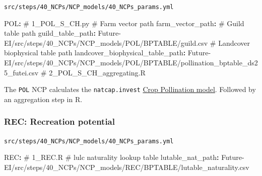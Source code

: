 \documentclass[
  letterpaper,
  DIV=11,
  numbers=noendperiod]{scrreprt}
\newenvironment{Shaded}{\begin{snugshade}}{\end{snugshade}}
\newcommand{\AttributeTok}[1]{\textcolor[rgb]{0.40,0.45,0.13}{#1}}
\newcommand{\CommentTok}[1]{\textcolor[rgb]{0.37,0.37,0.37}{#1}}
\newcommand{\FunctionTok}[1]{\textcolor[rgb]{0.28,0.35,0.67}{#1}}
\newcommand{\KeywordTok}[1]{\textcolor[rgb]{0.00,0.23,0.31}{\textbf{#1}}}
\newcommand{\StringTok}[1]{\textcolor[rgb]{0.13,0.47,0.30}{#1}}
\begin{document}
\begin{codelisting}

\caption{\texttt{src/steps/40\_NCPs/NCP\_models/40\_NCPs\_params.yml}}

\begin{Shaded}
\begin{Highlighting}[]
\FunctionTok{POL}\KeywordTok{:}
\CommentTok{  \# 1\_POL\_S\_CH.py}
\CommentTok{  \# Farm vector path}
\AttributeTok{  }\FunctionTok{farm\_vector\_path}\KeywordTok{:}\AttributeTok{ }\StringTok{\textquotesingle{}\textquotesingle{}}
\CommentTok{  \# Guild table path}
\AttributeTok{  }\FunctionTok{guild\_table\_path}\KeywordTok{:}
\AttributeTok{    Future{-}EI/src/steps/40\_NCPs/NCP\_models/POL/BPTABLE/guild.csv}
\CommentTok{  \# Landcover biophysical table path}
\AttributeTok{  }\FunctionTok{landcover\_biophysical\_table\_path}\KeywordTok{:}
\AttributeTok{    Future{-}EI/src/steps/40\_NCPs/NCP\_models/POL/BPTABLE/pollination\_bptable\_ds25\_futei.csv}
\CommentTok{  \# 2\_POL\_S\_CH\_aggregating.R}
\end{Highlighting}
\end{Shaded}

\end{codelisting}

The \texttt{POL} NCP calculates the \texttt{natcap.invest}
\href{https://invest.readthedocs.io/en/latest/models.html\#crop-pollination}{Crop
Pollination model}. Followed by an aggregation step in R.

\subsubsection{REC: Recreation potential}\label{REC}

\begin{codelisting}

\caption{\texttt{src/steps/40\_NCPs/NCP\_models/40\_NCPs\_params.yml}}

\begin{Shaded}
\begin{Highlighting}[]
\FunctionTok{REC}\KeywordTok{:}
\CommentTok{  \# 1\_REC.R}
\CommentTok{  \# lulc naturality lookup table}
\AttributeTok{  }\FunctionTok{lutable\_nat\_path}\KeywordTok{:}
\AttributeTok{    Future{-}EI/src/steps/40\_NCPs/NCP\_models/REC/BPTABLE/lutable\_naturality.csv}
\end{Highlighting}
\end{Shaded}

\end{codelisting}
\end{document}
